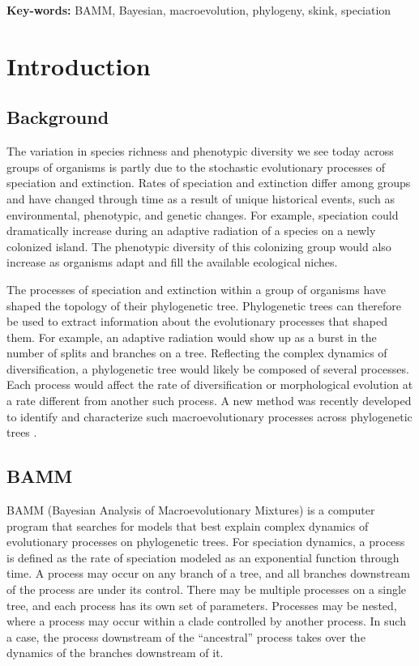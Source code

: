 \documentclass[12pt]{article}
\begin{document}
\begin{flushleft}
\textbf{Key-words:} BAMM, Bayesian, macroevolution, phylogeny, skink, speciation
\end{flushleft}


\pagebreak[4]


\section*{Introduction}

\subsection*{Background}

The variation in species richness and phenotypic diversity
we see today across groups of organisms is partly due
to the stochastic evolutionary processes of speciation and extinction.
%
Rates of speciation and extinction differ among groups
and have changed through time as a result of unique historical events,
such as environmental, phenotypic, and genetic changes.
%
For example, speciation could dramatically increase
during an adaptive radiation of a species on a newly colonized island.
%
The phenotypic diversity of this colonizing group
would also increase as organisms adapt and fill
the available ecological niches.


The processes of speciation and extinction within a group of organisms
have shaped the topology of their phylogenetic tree.
%
Phylogenetic trees can therefore be used to extract
information about the evolutionary processes that shaped them.
%
For example, an adaptive radiation would show up
as a burst in the number of splits and branches on a tree.
%
Reflecting the complex dynamics of diversification,
a phylogenetic tree would likely be composed of several processes.
%
Each process would affect the rate of diversification or morphological evolution
at a rate different from another such process.
%
A new method was recently developed to identify and characterize
such macroevolutionary processes across phylogenetic trees \citep{rab14plos}.


\subsection*{BAMM}

BAMM (Bayesian Analysis of Macroevolutionary Mixtures)
is a computer program that searches for models that best explain
complex dynamics of evolutionary processes on phylogenetic trees.
%
For speciation dynamics, a process is defined as the rate of speciation
modeled as an exponential function through time.
%
A process may occur on any branch of a tree,
and all branches downstream of the process are under its control.
%
There may be multiple processes on a single tree,
and each process has its own set of parameters.
%
Processes may be nested, where a process may occur
within a clade controlled by another process.
%
In such a case, the process downstream of the ``ancestral'' process
takes over the dynamics of the branches downstream of it.
\end{document}
